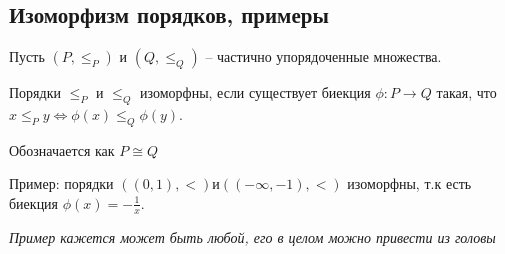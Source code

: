 \subsection{Изоморфизм порядков, примеры}

Пусть $(P, \le_P)$ и $(Q, \le_Q)$ -- частично упорядоченные множества.

Порядки $\le_P$ и $\le_Q$ изоморфны, если существует биекция $\phi: P \rightarrow Q$ такая, что $x \le_P y \Leftrightarrow \phi(x) \le_Q \phi(y)$.

Обозначается как $P \cong Q$

Пример: порядки $((0, 1), <) и ((-\infty, -1), <)$ изоморфны, т.к есть биекция $\phi(x) = -\frac{1}{x}$.

\textit{Пример кажется может быть любой, его в целом можно привести из головы}
